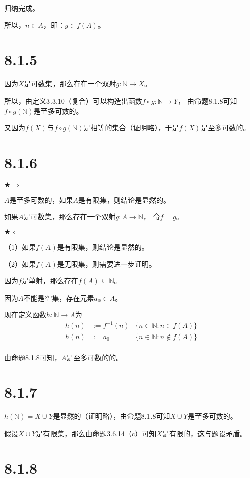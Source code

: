 \documentclass{article}
\theoremstyle{mystyle}
\begin{document}
归纳完成。

所以，$n \in A$，即：$y \in f(A)$。

\section*{8.1.5}

因为$X$是可数集，那么存在一个双射$g: \mathbb{N} \rightarrow X$。

所以，由定义3.3.10（复合）可以构造出函数$f \circ g: \mathbb{N} \rightarrow Y$，
由命题8.1.8可知$f \circ g(\mathbb{N})$是至多可数的。

又因为$f(X)$与$f \circ g(\mathbb{N})$是相等的集合（证明略），于是$f(X)$是至多可数的。

\section*{8.1.6}

$\bigstar \Rightarrow$

$A$是至多可数的，如果$A$是有限集，则结论是显然的。

如果$A$是可数集，那么存在一个双射$g: A \rightarrow \mathbb{N}$，
令$f = g$。

$\bigstar \Leftarrow$

（1）如果$f(A)$是有限集，则结论是显然的。

（2）如果$f(A)$是无限集，则需要进一步证明。

因为$f$是单射，那么存在$f(A) \subseteq \mathbb{N}$。

因为$A$不能是空集，存在元素$a_0 \in A$。

现在定义函数$h: \mathbb{N} \rightarrow A$为
\begin{align*}
  h(n) & := f^{-1}(n) & \{n \in \mathbb{N}: n \in f(A) \}      \\
  h(n) & := a_0       & \{n \in \mathbb{N}: n \not \in f(A) \} \\
\end{align*}

由命题8.1.8可知，$A$是至多可数的的。
\section*{8.1.7}

$h(\mathbb{N}) = X \cup Y$是显然的（证明略），由命题8.1.8可知$X \cup Y$是至多可数的。

假设$X \cup Y$是有限集，那么由命题3.6.14（c）可知$X$是有限的，这与题设矛盾。

\section*{8.1.8}
\end{document}
